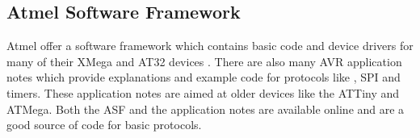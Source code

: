 \subsection{Atmel Software Framework}

Atmel offer a software framework which contains basic code and device drivers for many of their XMega and AT32 devices \citep{Atmel:ASF}. There are also many AVR application notes which provide explanations and example code for protocols like \itc , SPI and timers. These application notes are aimed at older devices like the ATTiny and ATMega. Both the ASF and the application notes are available online and are a good source of code for basic protocols.

%
%
%
%
%


